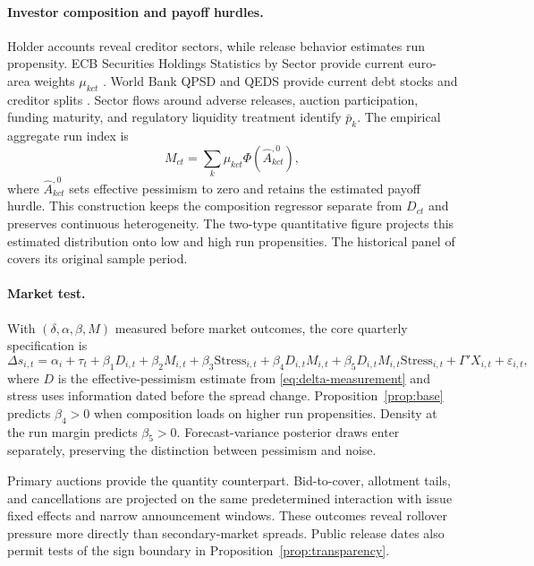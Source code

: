 \documentclass[11pt]{article}
\theoremstyle{definition}
\begin{document}
\paragraph{Investor composition and payoff hurdles.} Holder accounts reveal creditor sectors, while release behavior estimates run propensity. ECB Securities Holdings Statistics by Sector provide current euro-area weights $\mu_{kct}$ \citep{ECBSHSSData}. World Bank QPSD and QEDS provide current debt stocks and creditor splits \citep{WorldBankQPSD,WorldBankQEDS}. Sector flows around adverse releases, auction participation, funding maturity, and regulatory liquidity treatment identify $\bar p_k$. The empirical aggregate run index is
\begin{equation}
M_{ct}=\sum_k\mu_{kct}\Phi(\widehat A^{,0}_{kct}),
\label{eq:run-index}
\end{equation}
where $\widehat A^{,0}_{kct}$ sets effective pessimism to zero and retains the estimated payoff hurdle. This construction keeps the composition regressor separate from $D_{ct}$ and preserves continuous heterogeneity. The two-type quantitative figure projects this estimated distribution onto low and high run propensities. The historical panel of \citet{ArslanalpTsuda2014} covers its original sample period.

\paragraph{Market test.} With $(\delta,\alpha,\beta,M)$ measured before market outcomes, the core quarterly specification is
\begin{equation}
\Delta s_{i,t}=\alpha_i+\tau_t+\beta_1D_{i,t}+\beta_2M_{i,t}
+\beta_3\mathrm{Stress}_{i,t}+\beta_4D_{i,t}M_{i,t}
+\beta_5D_{i,t}M_{i,t}\mathrm{Stress}_{i,t}
+\Gamma'X_{i,t}+\varepsilon_{i,t},
\label{eq:panel5}
\end{equation}
where $D$ is the effective-pessimism estimate from \eqref{eq:delta-measurement} and stress uses information dated before the spread change. Proposition~\ref{prop:base} predicts $\beta_4>0$ when composition loads on higher run propensities. Density at the run margin predicts $\beta_5>0$. Forecast-variance posterior draws enter separately, preserving the distinction between pessimism and noise.

Primary auctions provide the quantity counterpart. Bid-to-cover, allotment tails, and cancellations are projected on the same predetermined interaction with issue fixed effects and narrow announcement windows. These outcomes reveal rollover pressure more directly than secondary-market spreads. Public release dates also permit tests of the sign boundary in Proposition~\ref{prop:transparency}.
\end{document}
